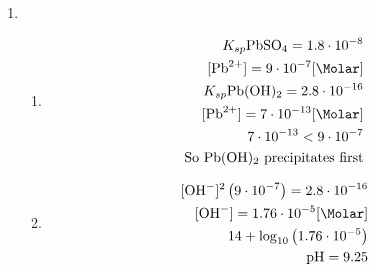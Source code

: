 \documentclass[12pt]{article}
\begin{document}
\begin{enumerate}
\begin{enumerate}
    \end{enumerate}

    \setcounter{enumi}{33}

  \item

    \begin{enumerate}

      \item 

        \begin{equation}
          \begin{split}
            K_{sp} \ce{PbSO4} = 1.8\cdot10^{-8}\\
            [\ce{Pb^2+}]=9\cdot10^{-7}[\si{\Molar}]\\
            K_{sp} \ce{Pb(OH)2} = 2.8\cdot10^{-16}\\
            [\ce{Pb^2+}]=7\cdot10^{-13}[\si{\Molar}]\\
            7\cdot10^{-13} < 9\cdot10^{-7}\\
            \text{So \ce{Pb(OH)2} precipitates first}
          \end{split}
          \label{4}
        \end{equation}

      \item 

        \begin{equation}
          \begin{split}
            [\ce{OH-}]^2\left( 9\cdot10^{-7} \right)=2.8\cdot10^{-16}\\
            [\ce{OH-}]=1.76\cdot10^{-5}[\si{\Molar}]\\
            14+\log_{10}\left( 1.76\cdot10^{-5} \right)\\
            \ce{pH}=9.25
          \end{split}
          \label{5}
        \end{equation}


    \end{enumerate}

\end{enumerate}
\end{document}
